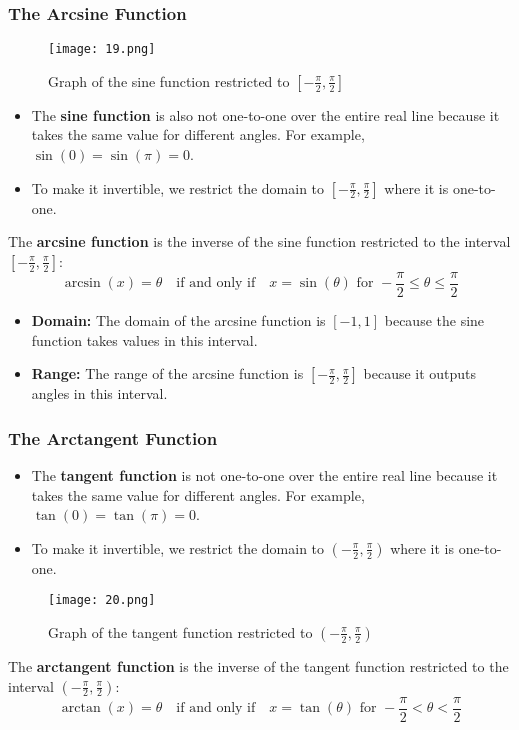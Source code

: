 \subsubsection{The Arcsine Function}
\begin{figure}
    \centering
    \texttt{[image: 19.png]}
    \caption{Graph of the sine function restricted to $[- \frac{\pi}{2}, \frac{\pi}{2}]$}
\end{figure}
\begin{itemize}
    \item The \textbf{sine function} is also not one-to-one over the entire real line because it takes the same value for different angles. For example, $\sin(0) = \sin(\pi) = 0$.
    \item To make it invertible, we restrict the domain to $[- \frac{\pi}{2}, \frac{\pi}{2}]$ where it is one-to-one.
\end{itemize}
The \textbf{arcsine function} is the inverse of the sine function restricted to the interval $[- \frac{\pi}{2}, \frac{\pi}{2}] $:
\[ \arcsin(x) = \theta \quad \text{if and only if} \quad x = \sin(\theta) \text{ for } -\frac{\pi}{2} \leq \theta \leq \frac{\pi}{2} \]
\begin{itemize}
    \item \textbf{Domain:} The domain of the arcsine function is $[-1, 1]$ because the sine function takes values in this interval.
    \item \textbf{Range:} The range of the arcsine function is $[- \frac{\pi}{2}, \frac{\pi}{2}]$ because it outputs angles in this interval.
\end{itemize}

\subsubsection{The Arctangent Function}
\begin{itemize}
    \item The \textbf{tangent function} is not one-to-one over the entire real line because it takes the same value for different angles. For example, $\tan(0) = \tan(\pi) = 0$.
    \item To make it invertible, we restrict the domain to $(- \frac{\pi}{2}, \frac{\pi}{2})$ where it is one-to-one.
\end{itemize}
\begin{figure}
    \centering
    \texttt{[image: 20.png]}
    \caption{Graph of the tangent function restricted to $(- \frac{\pi}{2}, \frac{\pi}{2})$}
\end{figure}
The \textbf{arctangent function} is the inverse of the tangent function restricted to the interval $(- \frac{\pi}{2}, \frac{\pi}{2})$:
\[ \arctan(x) = \theta \quad \text{if and only if} \quad x = \tan(\theta) \text{ for } -\frac{\pi}{2} < \theta < \frac{\pi}{2} \]

